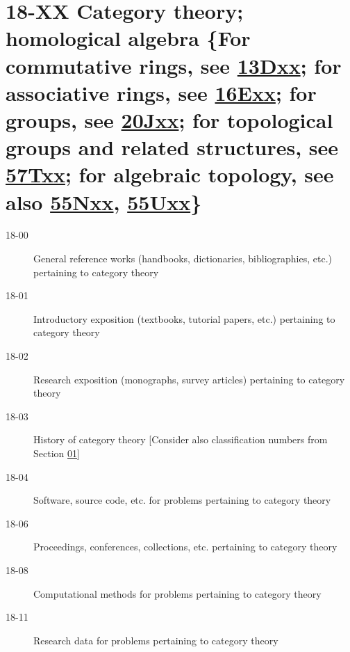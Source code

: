 \documentclass[letterpaper]{article}
\begin{document}
\section*{18-XX Category theory; homological algebra \{For commutative rings, see \hyperref[13Dxx]{13Dxx}; for associative rings, see \hyperref[16Exx]{16Exx}; for groups, see \hyperref[20Jxx]{20Jxx}; for topological groups and related structures, see \hyperref[57Txx]{57Txx}; for algebraic topology, see also \hyperref[55Nxx]{55Nxx}, \hyperref[55Uxx]{55Uxx}\} }\label{18-XX}
\begin{description}
\item [18-00]\label{18-00} General reference works (handbooks, dictionaries, bibliographies, etc.) pertaining to category theory
\item [18-01]\label{18-01} Introductory exposition (textbooks, tutorial papers, etc.) pertaining to category theory
\item [18-02]\label{18-02} Research exposition (monographs, survey articles) pertaining to category theory
\item [18-03]\label{18-03} History of category theory [Consider also classification numbers from Section \hyperref[01-XX]{01}]
\item [18-04]\label{18-04} Software, source code, etc. for problems pertaining to category theory
\item [18-06]\label{18-06} Proceedings, conferences, collections, etc. pertaining to category theory
\item [18-08]\label{18-08} Computational methods for problems pertaining to category theory
\item [18-11]\label{18-11} Research data for problems pertaining to category theory
\end{description}
\end{document}
